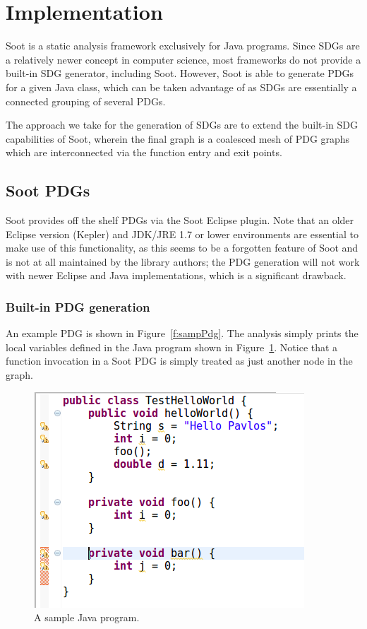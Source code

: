 \documentclass[authoryear,preprint]{sigplanconf}
\begin{document}
\section{Implementation}
\label{sec:introduction}

Soot is a static analysis framework exclusively for Java programs. Since SDGs are a relatively newer concept in computer science, most frameworks do not provide a built-in SDG generator, including Soot. However, Soot is able to generate PDGs for a given Java class, which can be taken advantage of as SDGs are essentially a connected grouping of several PDGs.

The approach we take for the generation of SDGs are to extend the built-in SDG capabilities of Soot, wherein the final graph is a coalesced mesh of PDG graphs which are interconnected via the function entry and exit points.

\subsection{Soot PDGs}
\label{sec:some_section}

Soot provides off the shelf PDGs via the Soot Eclipse plugin. Note that an older Eclipse version (Kepler) and JDK/JRE 1.7 or lower environments are essential to make use of this functionality, as this seems to be a forgotten feature of Soot and is not at all maintained by the library authors; the PDG generation will not work with newer Eclipse and Java implementations, which is a significant drawback.

\subsubsection{Built-in PDG generation}

An example PDG is shown in Figure~\ref{f:sampPdg}. The analysis simply prints the local variables defined in the Java program shown in Figure~\ref{f:sampProg}. Notice that a function invocation in a Soot PDG is simply treated as just another node in the graph.

\begin{figure}[ht]
	\centering
	\includegraphics[width=.9\linewidth]{figures/Selection_078}
	\caption[A sample Java program]{\label{f:sampProg}A sample Java program.}
\end{figure}
\end{document}
